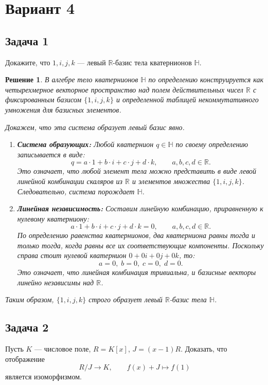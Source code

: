 \documentclass[14pt]{article}
\newtheorem*{solution}{Решение}
\begin{document}
	\newpage
	
	\section{Вариант 4}
	
	\subsection*{Задача 1}
	Докажите, что $1,i,j,k$ — левый $\mathbb R$-базис тела кватернионов $\mathbb H$.
	
	\begin{solution}
		В алгебре тело кватернионов $\mathbb H$ по определению конструируется как четырехмерное векторное пространство над полем действительных чисел $\mathbb R$ с фиксированным базисом $\{1, i, j, k\}$ и определенной таблицей некоммутативного умножения для базисных элементов.
		
		Докажем, что эта система образует левый базис явно.
		\begin{enumerate}
			\item \textbf{Система образующих:} Любой кватернион $q\in\mathbb H$ по своему определению записывается в виде:
			\[
			q = a\cdot 1 + b\cdot i + c\cdot j + d\cdot k,\qquad a,b,c,d\in\mathbb R.
			\]
			Это означает, что любой элемент тела можно представить в виде левой линейной комбинации скаляров из $\mathbb R$ и элементов множества $\{1,i,j,k\}$. Следовательно, система порождает $\mathbb H$.
			
			\item \textbf{Линейная независимость:} Составим линейную комбинацию, приравненную к нулевому кватерниону:
			\[
			a\cdot 1 + b\cdot i + c\cdot j + d\cdot k = 0,\qquad a,b,c,d\in\mathbb R.
			\]
			По определению равенства кватернионов, два кватерниона равны тогда и только тогда, когда равны все их соответствующие компоненты. Поскольку справа стоит нулевой кватернион $0 + 0i + 0j + 0k$, то:
			\[
			a=0,\; b=0,\; c=0,\; d=0.
			\]
			Это означает, что линейная комбинация тривиальна, и базисные векторы линейно независимы над $\mathbb R$.
		\end{enumerate}
		Таким образом, $\{1,i,j,k\}$ строго образует левый $\mathbb R$-базис тела $\mathbb H$.
	\end{solution}
	
	\subsection*{Задача 2}
	Пусть $K$ — числовое поле, $R=K[x]$, $J=(x-1)R$. Доказать, что отображение
	\[
	R/J \to K,\qquad f(x)+J \mapsto f(1)
	\]
	является изоморфизмом.
	
\end{document}
